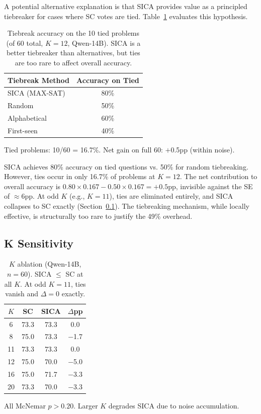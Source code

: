 \documentclass[11pt,a4paper]{article}
\begin{document}
A potential alternative explanation is that SICA provides value as a principled tiebreaker for cases where SC votes are tied. Table~\ref{tab:tiebreak} evaluates this hypothesis.

\begin{table}[t]
\centering
\small
\caption{Tiebreak accuracy on the 10 tied problems (of 60 total, $K{=}12$, Qwen-14B). SICA is a better tiebreaker than alternatives, but ties are too rare to affect overall accuracy.}
\label{tab:tiebreak}
\begin{tabular}{lc}
\toprule
\textbf{Tiebreak Method} & \textbf{Accuracy on Tied} \\
\midrule
SICA (MAX-SAT) & 80\% \\
Random & 50\% \\
Alphabetical & 60\% \\
First-seen & 40\% \\
\bottomrule
\end{tabular}
\vspace{0.3em}
\footnotesize{Tied problems: 10/60 = 16.7\%. Net gain on full 60: $+$0.5pp (within noise).}
\end{table}

SICA achieves 80\% accuracy on tied questions vs. 50\% for random tiebreaking. However, ties occur in only 16.7\% of problems at $K{=}12$. The net contribution to overall accuracy is $0.80 \times 0.167 - 0.50 \times 0.167 = +0.5$pp, invisible against the SE of $\approx$6pp. At odd $K$ (e.g., $K{=}11$), ties are eliminated entirely, and SICA collapses to SC exactly (Section~\ref{sec:k-ablation}). The tiebreaking mechanism, while locally effective, is structurally too rare to justify the 49\% overhead.

\subsection{K Sensitivity}
\label{sec:k-ablation}

\begin{table}[t]
\centering
\small
\caption{$K$ ablation (Qwen-14B, $n{=}60$). SICA $\leq$ SC at all $K$. At odd $K{=}11$, ties vanish and $\Delta = 0$ exactly.}
\label{tab:k-ablation}
\begin{tabular}{cccc}
\toprule
$K$ & SC & SICA & $\Delta$pp \\
\midrule
6 & 73.3 & 73.3 & 0.0 \\
8 & 75.0 & 73.3 & $-$1.7 \\
11 & 73.3 & 73.3 & 0.0 \\
12 & 75.0 & 70.0 & $-$5.0 \\
16 & 75.0 & 71.7 & $-$3.3 \\
20 & 73.3 & 70.0 & $-$3.3 \\
\bottomrule
\end{tabular}
\vspace{0.3em}
\footnotesize{All McNemar $p > 0.20$. Larger $K$ degrades SICA due to noise accumulation.}
\end{table}
\end{document}
